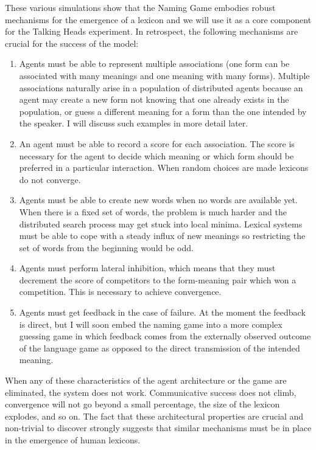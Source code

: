 These various simulations show that the Naming Game embodies robust
mechanisms for the emergence of a lexicon and we will use it 
as a core component for the Talking Heads experiment. 
In retrospect, the following mechanisms 
are crucial for the success of the model:
\begin{enumerate}
\item Agents must be able to represent multiple associations
(one form can be associated with many meanings and one
meaning with many forms). Multiple associations 
naturally arise in a population of distributed 
agents because an agent may create a new form not 
knowing that one already exists in the population, or
guess a different meaning for a form than the one
intended by the speaker. I will discuss such examples in
more detail later. 
\item An agent must be able 
to record a score for each association. The score is necessary
for the agent to decide which meaning or which form should 
be preferred in a particular interaction. When random 
choices are made lexicons do not converge. 
\item Agents must be able to create new words when no words are 
available yet. When there is a fixed set of words, the problem 
is much harder and the distributed search 
process may get stuck into local minima. 
Lexical systems must be able to cope with 
a steady influx of new meanings so restricting the set 
of words from the beginning would be odd. 
\item Agents must perform lateral inhibition, which means that 
they must decrement the score of competitors to the
form-meaning pair which won a competition. 
This is necessary to achieve convergence. 
\item Agents must get feedback in the case of failure. At the moment
the feedback is direct, but I will soon embed the naming game
into a more complex guessing game in which feedback comes
from the externally observed outcome of the language 
game as opposed to the direct transmission of the intended meaning. 
\end{enumerate}
When any of these characteristics of the agent
architecture or the game
are eliminated, the system does not work. Communicative success
does not climb, convergence will not go beyond a small percentage, 
the size of the lexicon explodes, and so on. The fact that 
these architectural properties are crucial and non-trivial to 
discover strongly suggests that similar mechanisms must be in 
place in the emergence of human lexicons. 

